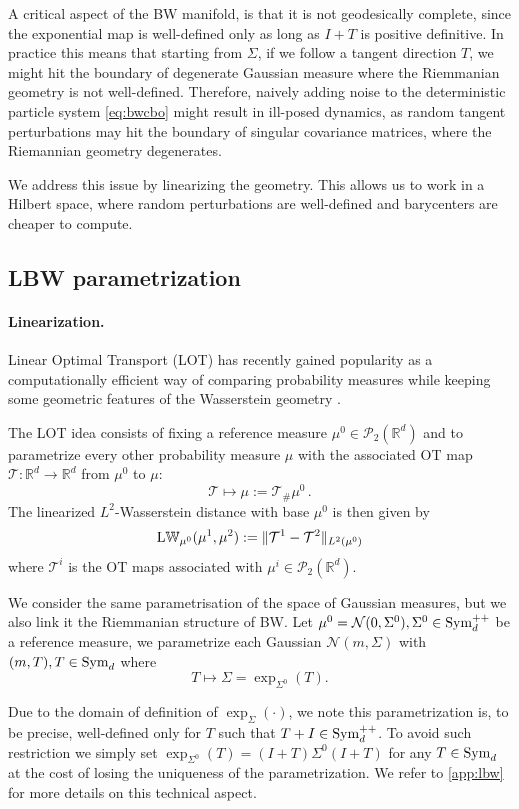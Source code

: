\documentclass{article}
\theoremstyle{plain}
\theoremstyle{definition}
\theoremstyle{remark}
\newcommand{\Rd}{ {\mathbb{R}^d}}
\newcommand{\sym}{\textup{Sym}_d}
\newcommand{\pd}{\textup{Sym}^{++}_d}
\newcommand{\LW}{\textup{L}\mathbb{W}}
\newcommand{\rev}{}
\begin{document}
A critical aspect of the BW manifold, is that it is not geodesically complete, since the exponential map is well-defined only as long as $I + T$ is positive definitive. In practice this means that starting from $\Sigma$, if we follow a tangent direction $T$, we might hit the boundary of degenerate Gaussian measure where the Riemmanian geometry is not well-defined.
Therefore, naively adding noise to the deterministic particle system \eqref{eq:bwcbo} might result in ill-posed dynamics,
\rev{as random tangent perturbations may hit the boundary of singular covariance matrices, where the Riemannian geometry degenerates.}

We address this issue by linearizing the geometry. \rev{This allows us to work in a Hilbert space, where random perturbations are well-defined and barycenters are cheaper to compute.}


\subsection{LBW parametrization} 

\paragraph{Linearization.} Linear Optimal Transport (LOT) has recently gained popularity as a computationally efficient way of comparing probability measures while keeping some geometric features of the Wasserstein geometry \cite{kolouri2016continuous,moosmuller2023linear,sarrazin2024lot,craig2020lot}.

The LOT idea consists of fixing a reference measure $\mu^0 \in \mathcal{P}_2(\Rd)$ and to parametrize every other probability measure $\mu$ with the associated OT map $\mathcal{T}:\Rd \to \Rd$ from $\mu^0$ to $\mu$:
\[\mathcal{T} \mapsto  \mu := \mathcal{T}_{\#}\mu^0\,. \]
The linearized $L^2$-Wasserstein distance with base $\mu^0$ is then given by
\[\LW_{\mu^0}(\mu^1, \mu^2):= \|\mathcal{T}^1 - \mathcal{T}^2
\|_{L^2(\mu^0)}\]
where $\mathcal{T}^i$ is the OT maps associated with $\mu^i\in \mathcal{P}_2(\Rd)$.

We consider the same parametrisation of the space of Gaussian measures, but we also link it the Riemmanian structure of BW. Let $\mu^0 = \mathcal{N}(0, \Sigma^0), \Sigma^0 \in \pd$ be a reference measure, we parametrize each Gaussian $\mathcal{N}(m, \Sigma)$ with $(m, T), T\in \sym$ where
\[
T \mapsto \Sigma = \exp_{\Sigma^0}(T). \]

Due to the domain of definition of $\exp_{\Sigma}(\cdot)$, we note this parametrization is, to be precise,  well-defined only for $T$ such that $T + I \in \pd$. To avoid such restriction we simply set $\exp_{\Sigma^0}(T) = (I + T) \Sigma^0(I + T)$ for any $T\in \sym$ at the cost of losing the uniqueness of the parametrization. We refer to \cref{app:lbw} for more details on this technical aspect.
\end{document}
